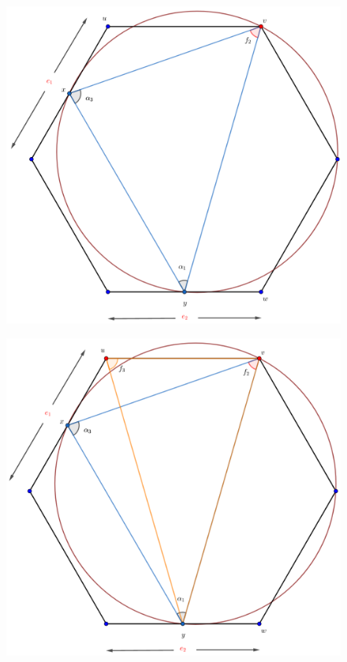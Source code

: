 {\begin{frame}
  \begin{figure}
    \centering
    \includegraphics[width=.65 \paperwidth]{./images/Bosquejo4.png}
  \end{figure}
\end{frame}

\begin{frame}
  \begin{figure}
    \centering
    \includegraphics[width=.65 \paperwidth]{./images/Bosquejo5.png}
  \end{figure}
\end{frame}

}

